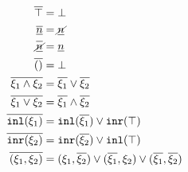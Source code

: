 \begin{figure}
~~
\begin{subequations}
\begin{align}
  \cdual{\ctruth} &= \cfalsity \\
  \cdual{\cnum{n}} &= \cnotnum{n} \\
  \cdual{\cnotnum{n}} &= \cnum{n} \\
  \cdual{\cunit} &= \cfalsity \\
  \cdual{\cand{\xi_1}{\xi_2}} &= \cor{\cdual{\xi_1}}{\cdual{\xi_2}} \\
  \cdual{\cor{\xi_1}{\xi_2}} &= \cand{\cdual{\xi_1}}{\cdual{\xi_2}} \\
  \cdual{\cinl{\xi_1}} &= \cor{ \cinl{\cdual{\xi_1}} }{ \cinr{\ctruth} } \\
  \cdual{\cinr{\xi_2}} &= \cor{ \cinr{\cdual{\xi_2}} }{ \cinl{\ctruth} } \\
  \cdual{\cpair{\xi_1}{\xi_2}} &=
  \cor{ \cor{ 
    \cpair{\xi_1}{\cdual{\xi_2}}
  }{
    \cpair{\cdual{\xi_1}}{\xi_2}
  }}{
    \cpair{\cdual{\xi_1}}{\cdual{\xi_2}}
  }
\end{align}
\end{subequations}
\end{figure}

